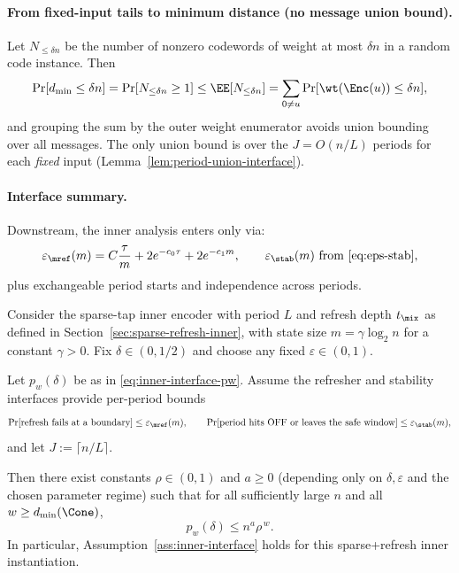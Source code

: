 \paragraph{From fixed-input tails to minimum distance (no message union bound).}
Let \(N_{\le \delta n}\) be the number of nonzero codewords of weight at most \(\delta n\) in a random code instance.
Then
\[
\Pr[d_{\min}\le \delta n] = \Pr[N_{\le \delta n}\ge 1]
\le \EE[N_{\le \delta n}]
= \sum_{0\neq u}\Pr[\wt(\Enc(u))\le \delta n],
\]
and grouping the sum by the outer weight enumerator avoids union bounding over all messages.
The only union bound is over the \(J=O(n/L)\) periods for each \emph{fixed} input (Lemma~\ref{lem:period-union-interface}).

\paragraph{Interface summary.}
Downstream, the inner analysis enters only via:
\[
\varepsilon_{\mref}(m)= C\frac{\tau}{m}+2e^{-c_0\tau}+2e^{-c_1 m},
\qquad
\varepsilon_{\stab}(m)\ \text{from \eqref{eq:eps-stab}},
\]
plus exchangeable period starts and independence across periods.



\begin{corollary}
\label{cor:sparse-refresh-implies-interface}
Consider the sparse-tap inner encoder with period $L$ and refresh depth $t_{\mix}$ as defined in
Section~\ref{sec:sparse-refresh-inner}, with state size $m=\gamma\log_2 n$ for a constant $\gamma>0$.
Fix $\delta\in(0,1/2)$ and choose any fixed $\varepsilon\in(0,1)$.

Let $p_w(\delta)$ be as in \eqref{eq:inner-interface-pw}.
Assume the refresher and stability interfaces provide per-period bounds
\[
\Pr[\text{refresh fails at a boundary}]\le \varepsilon_{\mref}(m),
\qquad
\Pr[\text{period hits OFF or leaves the safe window}]\le \varepsilon_{\stab}(m),
\]
and let $J:=\lceil n/L\rceil$.

Then there exist constants $\rho\in(0,1)$ and $a\ge 0$ (depending only on $\delta,\varepsilon$ and the chosen parameter regime)
such that for all sufficiently large $n$ and all $w\ge d_{\min}(\Cone)$,
\[
p_w(\delta)\le n^{a}\rho^{\,w}.
\]
In particular, Assumption~\ref{ass:inner-interface} holds for this sparse+refresh inner instantiation.
\end{corollary}

